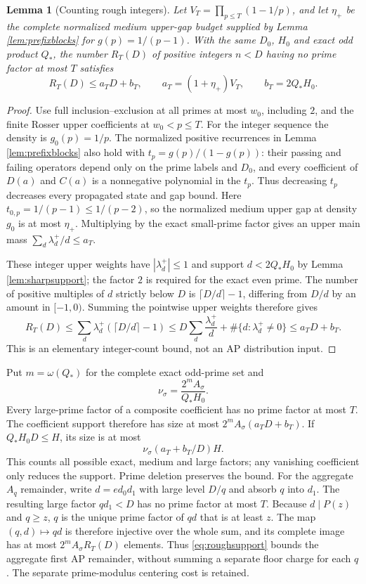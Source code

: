 \documentclass[11pt]{article}
\newtheorem{lemma}[theorem]{Lemma}
\begin{document}
\begin{lemma}[Counting rough integers]\label{lem:integerrough}
Let $V_T=\prod_{p\le T}(1-1/p)$, and let $\eta_+$ be the complete
normalized medium upper-gap budget supplied by Lemma \ref{lem:prefixblocks}
for $g(p)=1/(p-1)$. With the same $D_0$, $H_0$ and exact odd product $Q_*$,
the number $R_T(D)$ of positive integers $n<D$ having no prime factor
at most $T$ satisfies
\begin{equation}\label{eq:integerrough}
R_T(D)\le a_TD+b_T,\qquad
a_T=(1+\eta_+)V_T,\qquad b_T=2Q_*H_0.
\end{equation}
\end{lemma}
\begin{proof}
Use full inclusion--exclusion at all primes at most $w_0$, including $2$,
and the finite Rosser upper coefficients at $w_0<p\le T$.
For the integer sequence the density is $g_0(p)=1/p$.
The normalized positive recurrences in Lemma \ref{lem:prefixblocks}
also hold with $t_p=g(p)/(1-g(p))$: their passing and failing operators
depend only on the prime labels and $D_0$, and every coefficient of
$D(a)$ and $C(a)$ is a nonnegative polynomial in the $t_p$.
Thus decreasing $t_p$ decreases every propagated state and gap bound.
Here $t_{0,p}=1/(p-1)\le1/(p-2)$, so the normalized medium upper gap
at density $g_0$ is at most $\eta_+$. Multiplying by the exact small-prime
factor gives an upper main mass $\sum_d\lambda_d^+/d\le a_T$.

These integer upper weights have $|\lambda_d^+|\le1$ and support
$d<2Q_*H_0$ by Lemma \ref{lem:sharpsupport}; the factor $2$ is required
for the exact even prime. The number of positive multiples of $d$
strictly below $D$ is $\lceil D/d\rceil-1$, differing from $D/d$ by
an amount in $[-1,0)$. Summing the pointwise upper weights therefore gives
\[
R_T(D)\le\sum_d\lambda_d^+(\lceil D/d\rceil-1)
\le D\sum_d\frac{\lambda_d^+}{d}+\#\{d:\lambda_d^+\ne0\}
\le a_TD+b_T.
\]
This is an elementary integer-count bound, not an AP distribution input.
\end{proof}

Put $m=\omega(Q_*)$ for the complete exact odd-prime set and
\[
\nu_\sigma=\frac{2^m A_\sigma}{Q_*H_0}.
\]
Every large-prime factor of a composite coefficient has no prime factor
at most $T$. The coefficient support therefore has size at most
$2^mA_\sigma(a_TD+b_T)$. If $Q_*H_0D\le H$, its size is at most
\begin{equation}\label{eq:roughsupport}
\nu_\sigma(a_T+b_T/D)H.
\end{equation}
This counts all possible exact, medium and large factors; any vanishing
coefficient only reduces the support. Prime deletion preserves the bound.
For the aggregate $A_q$ remainder, write $d=e d_0d_1$ with large level
$D/q$ and absorb $q$ into $d_1$. The resulting large factor
$qd_1<D$ has no prime factor at most $T$. Because $d\mid P(z)$ and
$q\ge z$, $q$ is the unique prime factor of $qd$ that is at least $z$.
The map $(q,d)\mapsto qd$ is therefore injective over the whole sum,
and its complete image has at most $2^mA_\sigma R_T(D)$ elements.
Thus \eqref{eq:roughsupport} bounds the aggregate first AP remainder,
without summing a separate floor charge for each $q$.
The separate prime-modulus centering cost is retained.
\end{document}
